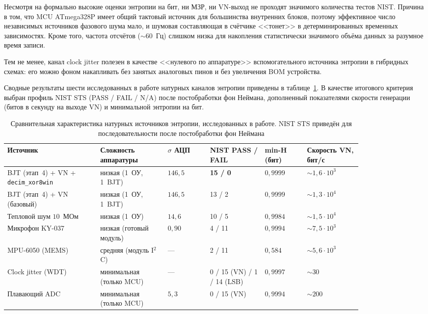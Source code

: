 Несмотря на формально высокие оценки энтропии на бит, ни МЗР, ни VN-выход не
проходят значимого количества тестов NIST. Причина в том, что MCU ATmega328P
имеет общий тактовый источник для большинства внутренних блоков, поэтому
эффективное число независимых источников фазового шума мало, и шумовая
составляющая в счётчике <<тонет>> в детерминированных временных
зависимостях. Кроме того, частота отсчётов ($\sim 60$~Гц) слишком низка для
накопления статистически значимого объёма данных за разумное время записи.

Тем не менее, канал clock jitter полезен в качестве <<нулевого по аппаратуре>>
вспомогательного источника энтропии в гибридных схемах: его можно фоном
накапливать без занятых аналоговых пинов и без увеличения BOM устройства.


Сводные результаты шести исследованных в работе натурных каналов энтропии приведены в
таблице~\ref{tab:final_compare}. В качестве итогового критерия выбран профиль NIST
STS (PASS / FAIL / N/A) после постобработки фон Неймана, дополненный показателями
скорости генерации (битов в секунду на выходе VN) и минимальной энтропии на бит.

\begin{table}[H]
  \centering
  \footnotesize
  \caption{Сравнительная характеристика натурных источников энтропии,
  исследованных в работе. NIST STS приведён для последовательности после
  постобработки фон Неймана}
  \label{tab:final_compare}
  \begin{tabular}{|p{0.22\linewidth}|p{0.16\linewidth}|p{0.10\linewidth}|p{0.13\linewidth}|p{0.10\linewidth}|p{0.13\linewidth}|}
    \hline
    Источник & Сложность аппаратуры & $\sigma$ АЦП & NIST PASS / FAIL & min-H (бит) & Скорость VN, бит/с \\
    \hline
    BJT (этап~4) + VN + \texttt{decim\_xor8win} & низкая (1~ОУ, 1~BJT) & $146{,}5$ & \textbf{15 / 0} & $0{,}9999$ & ${\sim} 1{,}6\cdot 10^3$ \\
    \hline
    BJT (этап~4) + VN (базовый) & низкая (1~ОУ, 1~BJT) & $146{,}5$ & 13 / 2 & $0{,}9999$ & ${\sim} 1{,}3\cdot 10^4$ \\
    \hline
    Тепловой шум $10$~МОм & низкая (1~ОУ) & $14{,}6$ & 10 / 5 & $0{,}9984$ & ${\sim} 1{,}5\cdot 10^4$ \\
    \hline
    Микрофон KY-037 & низкая (готовый модуль) & $0{,}90$ & 4 / 11 & $0{,}9994$ & ${\sim} 7{,}5\cdot 10^3$ \\
    \hline
    MPU-6050 (MEMS) & средняя (модуль I$^2$C) & --- & 2 / 11 & $0{,}584$ & ${\sim} 5{,}6\cdot 10^3$ \\
    \hline
    Clock jitter (WDT) & минимальная (только MCU) & --- & 0 / 15 (VN) / 1 / 14 (LSB) & $0{,}9997$ & ${\sim} 30$ \\
    \hline
    Плавающий ADC & минимальная (только MCU) & $5{,}3$ & 0 / 15 (VN) & $0{,}9994$ & ${\sim} 200$ \\
    \hline
  \end{tabular}
\end{table}

